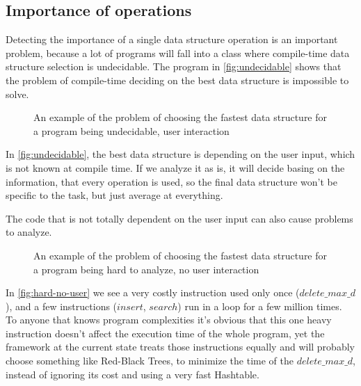 \documentclass[a4paper,11pt]{article}
\begin{document}
	\subsection{Importance of operations} \label{sub:importance}

		Detecting the importance of a single data structure operation is an important problem, because a lot of
		programs will fall into a class where compile-time data structure selection is undecidable. The
        program in \autoref{fig:undecidable} shows that the problem of compile-time deciding on the best data structure
        is impossible to solve.

        \begin{figure}[!h]
			

			\caption{An example of the problem of choosing the fastest data structure for a program being
			undecidable, user interaction}

			\label{fig:undecidable}
		\end{figure}

		In \autoref{fig:undecidable}, the best data structure is depending on the user input, which is not known at
		compile time. If we analyze it as is, it will decide basing on the information, that every operation is
		used, so the final data structure won't be specific to the task, but just average at everything.

		The code that is not totally dependent on the user input can also cause problems to analyze.

        \begin{figure}[!h]
			

			\caption{An example of the problem of choosing the fastest data structure for a program being hard to
            analyze, no user interaction}

			\label{fig:hard-no-user}
		\end{figure}

		In \autoref{fig:hard-no-user} we see a very costly instruction used only once
		($delete\_max\_d$), and a few instructions ($insert$, $search$) run in a loop for a few million times.
		To anyone that knows program complexities it's obvious that this one heavy instruction doesn't affect
		the execution time of the whole program, yet the framework at the current state treats those
		instructions equally and will probably choose something like Red-Black Trees, to minimize the time of
		the $delete\_max\_d$, instead of ignoring its cost and using a very fast Hashtable.
\end{document}
